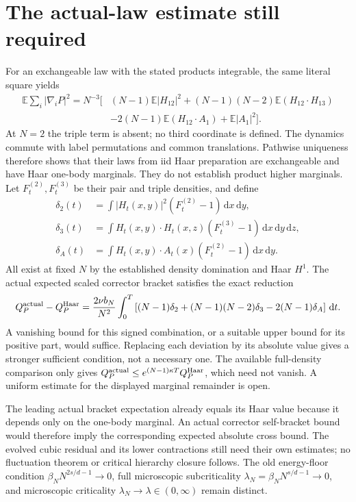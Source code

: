 \documentclass[10pt]{article}
\newcommand{\E}{\mathbb E}
\newcommand{\dd}{\,\mathrm d}
\begin{document}
\section*{The actual-law estimate still required}
For an exchangeable law with the stated products integrable, the same literal
square yields
\begin{align*}
 \E\sum_i|\nabla_iP|^2=N^{-3}\big[&
 (N-1)\E|H_{12}|^2+(N-1)(N-2)\E(H_{12}\cdot H_{13})\\
 &-2(N-1)\E(H_{12}\cdot A_1)+\E|A_1|^2\big].
\end{align*}
At $N=2$ the triple term is absent; no third coordinate is defined.
The dynamics commute with label permutations and common translations.
Pathwise uniqueness therefore shows that their laws from iid Haar preparation
are exchangeable and have Haar one-body marginals. They do not establish product higher marginals.
Let $F_t^{(2)},F_t^{(3)}$ be their pair and triple densities, and define
\begin{align*}
 \delta_2(t)&=\int|H_t(x,y)|^2(F_t^{(2)}-1)\dd x\dd y,\\
 \delta_3(t)&=\int H_t(x,y)\cdot H_t(x,z)(F_t^{(3)}-1)\dd x\dd y\dd z,\\
 \delta_A(t)&=\int H_t(x,y)\cdot A_t(x)(F_t^{(2)}-1)\dd x\dd y.
\end{align*}
All exist at fixed $N$ by the established density domination and Haar $H^1$.
The actual expected scaled corrector bracket satisfies the exact reduction
\[
 Q_P^{\rm actual}-Q_P^{\rm Haar}
 =\frac{2\nu b_N}{N^2}\int_0^T
 \left[(N-1)\delta_2+(N-1)(N-2)\delta_3-2(N-1)\delta_A\right]\dd t.
\]
A vanishing bound for this signed combination, or a suitable upper bound
for its positive part, would suffice. Replacing each deviation by its absolute
value gives a stronger sufficient condition, not a necessary one.
The available full-density comparison only gives
$Q_P^{\rm actual}\le e^{(N-1)\kappa T}Q_P^{\rm Haar}$, which need not vanish.
A uniform estimate for the displayed marginal remainder is open.

The leading actual bracket expectation already equals its Haar value because
it depends only on the one-body marginal. An actual corrector self-bracket
bound would therefore imply the corresponding expected absolute cross bound.
The evolved cubic residual and its lower contractions still need their own
estimates; no fluctuation theorem or critical hierarchy closure follows.
The old energy-floor condition $\beta_NN^{2s/d-1}\to0$, full microscopic
subcriticality $\lambda_N=\beta_NN^{s/d-1}\to0$, and microscopic criticality
$\lambda_N\to\lambda\in(0,\infty)$ remain distinct.
\end{document}
